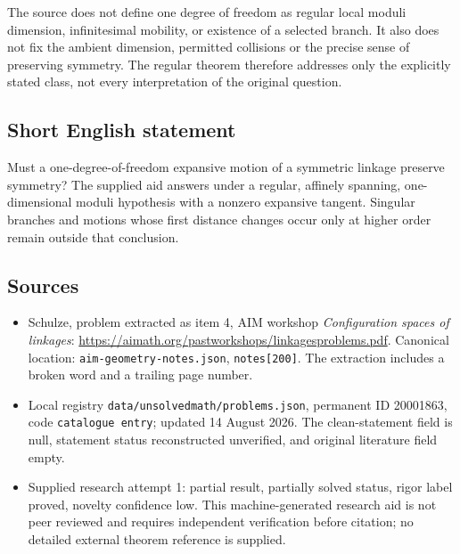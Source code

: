 \documentclass[11pt]{article}
\begin{document}
The source does not define one degree of freedom as regular local moduli dimension, infinitesimal mobility, or existence of a selected branch. It also does not fix the ambient dimension, permitted collisions or the precise sense of preserving symmetry. The regular theorem therefore addresses only the explicitly stated class, not every interpretation of the original question.
\subsection{Short English statement}
Must a one-degree-of-freedom expansive motion of a symmetric linkage preserve symmetry? The supplied aid answers under a regular, affinely spanning, one-dimensional moduli hypothesis with a nonzero expansive tangent. Singular branches and motions whose first distance changes occur only at higher order remain outside that conclusion.
\subsection{Sources}
\begin{itemize}
\item Schulze, problem extracted as item 4, AIM workshop \emph{Configuration spaces of linkages}: \url{https://aimath.org/pastworkshops/linkagesproblems.pdf}. Canonical location: \texttt{aim-geometry-notes.json}, \texttt{notes[200]}. The extraction includes a broken word and a trailing page number.
\item Local registry \texttt{data/unsolvedmath/problems.json}, permanent ID 20001863, code \texttt{catalogue entry}; updated 14 August 2026. The clean-statement field is null, statement status reconstructed unverified, and original literature field empty.
\item Supplied research attempt 1: partial result, partially solved status, rigor label proved, novelty confidence low. This machine-generated research aid is not peer reviewed and requires independent verification before citation; no detailed external theorem reference is supplied.
\end{itemize}
\end{document}
